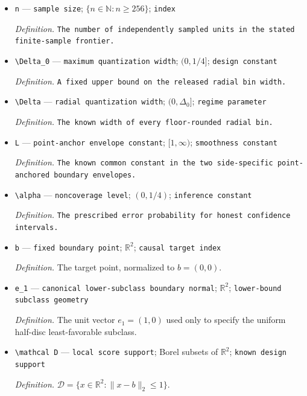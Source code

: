 \documentclass{article}
\begin{document}
\begin{itemize}
  \item \texttt{n} --- \texttt{sample size}; \(\{n\in\mathbb{N}:n\geq256\}\); \texttt{index}
  \par\smallskip\noindent\emph{Definition.} \texttt{The number of independently sampled units in the stated finite-\allowbreak{}sample frontier.}
  \item \texttt{\textbackslash{}\allowbreak{}Delta\_\allowbreak{}0} --- \texttt{maximum quantization width}; \((0,1/4]\); \texttt{design constant}
  \par\smallskip\noindent\emph{Definition.} \texttt{A fixed upper bound on the released radial bin width.}
  \item \texttt{\textbackslash{}\allowbreak{}Delta} --- \texttt{radial quantization width}; \((0,\Delta_0]\); \texttt{regime parameter}
  \par\smallskip\noindent\emph{Definition.} \texttt{The known width of every floor-\allowbreak{}rounded radial bin.}
  \item \texttt{L} --- \texttt{point-\allowbreak{}anchor envelope constant}; \([1,\infty)\); \texttt{smoothness constant}
  \par\smallskip\noindent\emph{Definition.} \texttt{The known common constant in the two side-\allowbreak{}specific point-\allowbreak{}anchored boundary envelopes.}
  \item \texttt{\textbackslash{}\allowbreak{}alpha} --- \texttt{noncoverage level}; \((0,1/4)\); \texttt{inference constant}
  \par\smallskip\noindent\emph{Definition.} \texttt{The prescribed error probability for honest confidence intervals.}
  \item \texttt{b} --- \texttt{fixed boundary point}; \(\mathbb{R}^2\); \texttt{causal target index}
  \par\smallskip\noindent\emph{Definition.} The target point, normalized to \(b=(0,0)\).
  \item \texttt{e\_\allowbreak{}1} --- \texttt{canonical lower-\allowbreak{}subclass boundary normal}; \(\mathbb R^2\); \texttt{lower-\allowbreak{}bound subclass geometry}
  \par\smallskip\noindent\emph{Definition.} The unit vector \(e_1=(1,0)\) used only to specify the uniform half-disc least-favorable subclass.
  \item \texttt{\textbackslash{}\allowbreak{}mathcal D} --- \texttt{local score support}; Borel subsets of \(\mathbb{R}^2\); \texttt{known design support}
  \par\smallskip\noindent\emph{Definition.} \(\mathcal D=\{x\in\mathbb R^2:\lVert x-b\rVert_2\leq1\}\).

\end{itemize}
\end{document}
